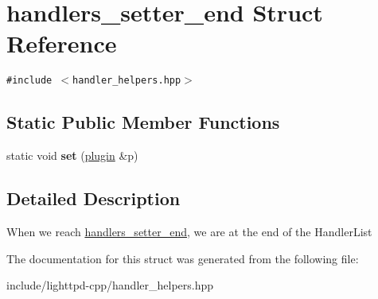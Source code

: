 \hypertarget{structhandlers__setter__end}{
\section{handlers\_\-setter\_\-end Struct Reference}
\label{structhandlers__setter__end}
}
{\tt \#include $<$handler\_\-helpers.hpp$>$}

\subsection*{Static Public Member Functions}
\begin{CompactItemize}
\item 
\hypertarget{structhandlers__setter__end_6072b8c4d09f5d83388845fa228164ae}{
static void \textbf{set} (\hyperlink{structplugin}{plugin} \&p)}
\label{structhandlers__setter__end_6072b8c4d09f5d83388845fa228164ae}

\end{CompactItemize}


\subsection{Detailed Description}
When we reach \hyperlink{structhandlers__setter__end}{handlers\_\-setter\_\-end}, we are at the end of the HandlerList 

The documentation for this struct was generated from the following file:\begin{CompactItemize}
\item 
include/lighttpd-cpp/handler\_\-helpers.hpp\end{CompactItemize}
